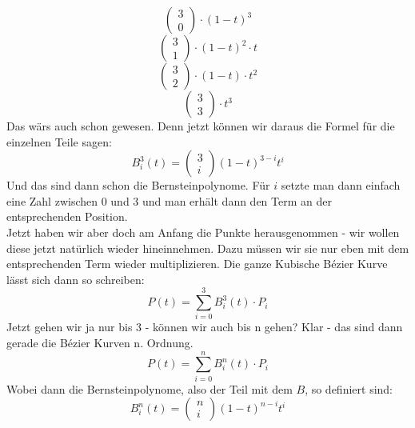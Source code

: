 \begin{displaymath}
\begin{pmatrix}
3 \\ 0
\end{pmatrix}\cdot (1-t)^3
\end{displaymath}
\begin{displaymath}
\begin{pmatrix}
3 \\ 1
\end{pmatrix}\cdot (1-t)^2\cdot t
\end{displaymath}
\begin{displaymath}
\begin{pmatrix}
3 \\ 2
\end{pmatrix}\cdot (1-t)\cdot t^2
\end{displaymath}
\begin{displaymath}
\begin{pmatrix}
3 \\ 3
\end{pmatrix}\cdot t^3
\end{displaymath}
Das wärs auch schon gewesen. Denn jetzt können wir daraus die Formel für die einzelnen Teile sagen:
\begin{displaymath}
B^3_i(t)=\begin{pmatrix}3 \\ i\end{pmatrix}(1-t)^{3-i}t^i
\end{displaymath}
Und das sind dann schon die Bernsteinpolynome.
Für \(i\) setzte man dann einfach eine Zahl zwischen 0 und 3 und man erhält dann den Term an der entsprechenden Position.\\ \newline
Jetzt haben wir aber doch am Anfang die Punkte herausgenommen - wir wollen diese jetzt natürlich wieder hineinnehmen. Dazu müssen wir sie nur eben mit dem entsprechenden Term wieder multiplizieren. Die ganze Kubische Bézier Kurve lässt sich dann so schreiben:
\begin{displaymath}
P(t) = \displaystyle\sum_{i=0}^{3} B^3_i(t)\cdot P_i
\end{displaymath}
Jetzt gehen wir ja nur bis 3 - können wir auch bis n gehen? Klar - das sind dann gerade die Bézier Kurven n. Ordnung.
\begin{displaymath}
P(t) = \displaystyle\sum_{i=0}^{n} B^n_i(t)\cdot P_i
\end{displaymath}
Wobei dann die Bernsteinpolynome, also der Teil mit dem \(B\), so definiert sind:
\begin{displaymath}
B^n_i(t)=\begin{pmatrix}n \\ i\end{pmatrix}(1-t)^{n-i}t^i
\end{displaymath}